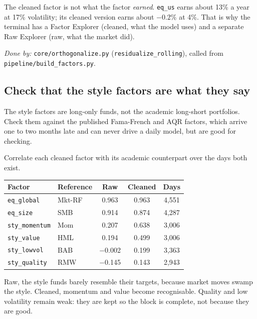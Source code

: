 \documentclass[11pt,a4paper]{article}
\newcommand{\fid}[1]{\texttt{#1}}
\newcommand{\doneby}[1]{\par{\raggedright\small\textit{Done by:} #1\par}}
\begin{document}
\begin{warn}
The cleaned factor is not what the factor \emph{earned}. \fid{eq\_us} earns about 13\%
a year at 17\% volatility; its cleaned version earns about $-0.2\%$ at 4\%. That is
why the terminal has a Factor Explorer (cleaned, what the model uses) and a separate
Raw Explorer (raw, what the market did).
\end{warn}

\doneby{\texttt{core/orthogonalize.py} (\texttt{residualize\_rolling}), called from \texttt{pipeline/build\_factors.py}.}

\subsection{Check that the style factors are what they say}

The style factors are long-only funds, not the academic long-short portfolios. Check
them against the published Fama-French and AQR factors, which arrive one to two
months late and can never drive a daily model, but are good for checking.

\begin{method}
Correlate each cleaned factor with its academic counterpart over the days both exist.
\end{method}

\begin{center}
\small
\begin{tabular}{@{}llccc@{}}
\toprule
Factor & Reference & Raw & Cleaned & Days \\
\midrule
\fid{eq\_global} & Mkt-RF & 0.963 & 0.963 & 4{,}551 \\
\fid{eq\_size} & SMB & 0.914 & 0.874 & 4{,}287 \\
\fid{sty\_momentum} & Mom & 0.207 & 0.638 & 3{,}006 \\
\fid{sty\_value} & HML & 0.194 & 0.499 & 3{,}006 \\
\fid{sty\_lowvol} & BAB & $-$0.002 & 0.199 & 3{,}363 \\
\fid{sty\_quality} & RMW & $-$0.145 & 0.143 & 2{,}943 \\
\bottomrule
\end{tabular}
\end{center}

Raw, the style funds barely resemble their targets, because market moves swamp the
style. Cleaned, momentum and value become recognisable. Quality and low volatility
remain weak: they are kept so the block is complete, not because they are good.
\end{document}
